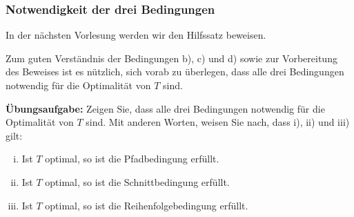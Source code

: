 \documentclass[smaller]{beamer}
\begin{document}
\begin{frame}
\frametitle{Notwendigkeit der drei Bedingungen}
 In der nächsten Vorlesung werden wir den Hilfssatz beweisen. \\ \vspace*{0.2cm}

Zum guten Verständnis der Bedingungen b), c) und d) sowie zur Vorbereitung des Beweises ist es nützlich, sich vorab zu überlegen, \alert{dass alle drei Bedingungen notwendig für die Optimalität von $T$ sind.} \\ \vspace*{0.2cm}

\textbf{Übungsaufgabe:} Zeigen Sie, dass alle drei Bedingungen notwendig für die Optimalität von $T$ sind. Mit anderen Worten, weisen Sie nach, dass i), ii) und iii) gilt:
\begin{enumerate}[i)]
    \item Ist $T$ optimal, so ist die \alert{Pfadbedingung} erfüllt.
    \item Ist $T$ optimal, so ist die \alert{Schnittbedingung} erfüllt.
    \item Ist $T$ optimal, so ist die \alert{Reihenfolgebedingung} erfüllt.
\end{enumerate}
\end{frame}
\end{document}
